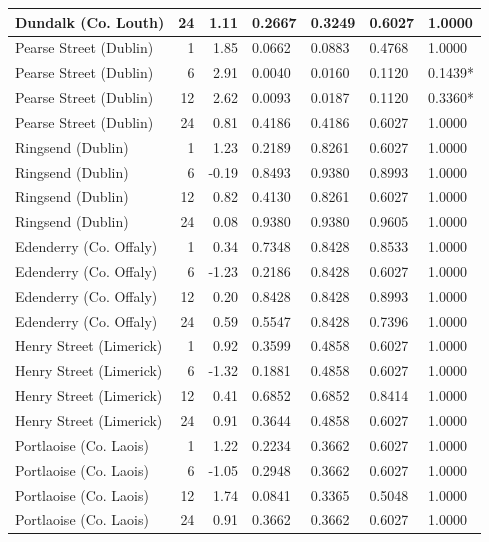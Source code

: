 \begin{table}[t]
{\begin{tabular}{lrrllll}
Dundalk (Co. Louth) & 24 & 1.11 & 0.2667 & 0.3249 & 0.6027 & 1.0000 \\
\midrule
Pearse Street (Dublin) & 1 & 1.85 & 0.0662 & 0.0883 & 0.4768 & 1.0000 \\
Pearse Street (Dublin) & 6 & 2.91 & 0.0040 & 0.0160 & 0.1120 & 0.1439* \\
Pearse Street (Dublin) & 12 & 2.62 & 0.0093 & 0.0187 & 0.1120 & 0.3360* \\
Pearse Street (Dublin) & 24 & 0.81 & 0.4186 & 0.4186 & 0.6027 & 1.0000 \\
\midrule
Ringsend (Dublin) & 1 & 1.23 & 0.2189 & 0.8261 & 0.6027 & 1.0000 \\
Ringsend (Dublin) & 6 & -0.19 & 0.8493 & 0.9380 & 0.8993 & 1.0000 \\
Ringsend (Dublin) & 12 & 0.82 & 0.4130 & 0.8261 & 0.6027 & 1.0000 \\
Ringsend (Dublin) & 24 & 0.08 & 0.9380 & 0.9380 & 0.9605 & 1.0000 \\
\midrule
Edenderry (Co. Offaly) & 1 & 0.34 & 0.7348 & 0.8428 & 0.8533 & 1.0000 \\
Edenderry (Co. Offaly) & 6 & -1.23 & 0.2186 & 0.8428 & 0.6027 & 1.0000 \\
Edenderry (Co. Offaly) & 12 & 0.20 & 0.8428 & 0.8428 & 0.8993 & 1.0000 \\
Edenderry (Co. Offaly) & 24 & 0.59 & 0.5547 & 0.8428 & 0.7396 & 1.0000 \\
\midrule
Henry Street (Limerick) & 1 & 0.92 & 0.3599 & 0.4858 & 0.6027 & 1.0000 \\
Henry Street (Limerick) & 6 & -1.32 & 0.1881 & 0.4858 & 0.6027 & 1.0000 \\
Henry Street (Limerick) & 12 & 0.41 & 0.6852 & 0.6852 & 0.8414 & 1.0000 \\
Henry Street (Limerick) & 24 & 0.91 & 0.3644 & 0.4858 & 0.6027 & 1.0000 \\
\midrule
Portlaoise (Co. Laois) & 1 & 1.22 & 0.2234 & 0.3662 & 0.6027 & 1.0000 \\
Portlaoise (Co. Laois) & 6 & -1.05 & 0.2948 & 0.3662 & 0.6027 & 1.0000 \\
Portlaoise (Co. Laois) & 12 & 1.74 & 0.0841 & 0.3365 & 0.5048 & 1.0000 \\
Portlaoise (Co. Laois) & 24 & 0.91 & 0.3662 & 0.3662 & 0.6027 & 1.0000 \\
\bottomrule
\end{tabular}%
}
\end{table}
